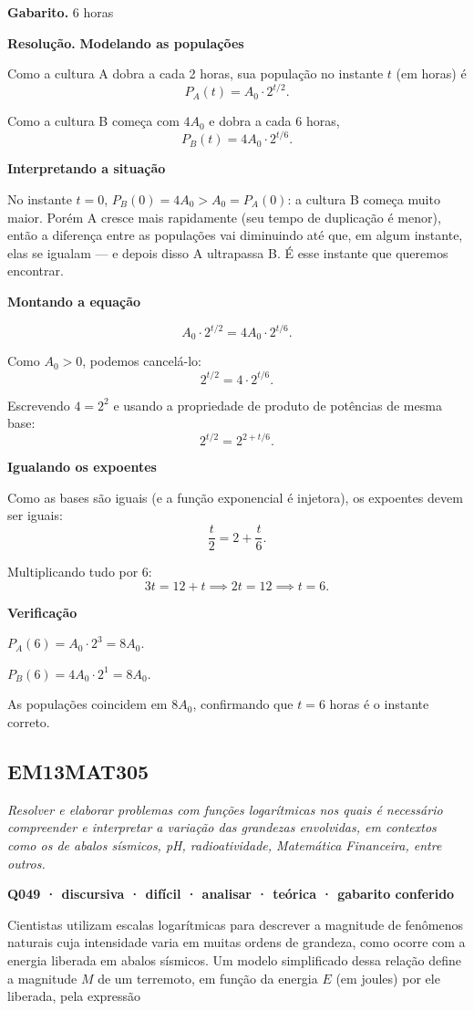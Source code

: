 \documentclass[11pt,a4paper]{article}
\begin{document}
\textbf{Gabarito.} 6 horas

\textbf{Resolução.} \textbf{Modelando as populações}

Como a cultura A dobra a cada 2 horas, sua população no instante $t$ (em horas) é
$$P_A(t) = A_0 \cdot 2^{t/2}.$$

Como a cultura B começa com $4A_0$ e dobra a cada 6 horas,
$$P_B(t) = 4A_0 \cdot 2^{t/6}.$$

\textbf{Interpretando a situação}

No instante $t=0$, $P_B(0)=4A_0 > A_0 = P_A(0)$: a cultura B começa muito maior. Porém A cresce mais rapidamente (seu tempo de duplicação é menor), então a diferença entre as populações vai diminuindo até que, em algum instante, elas se igualam — e depois disso A ultrapassa B. É esse instante que queremos encontrar.

\textbf{Montando a equação}

$$A_0 \cdot 2^{t/2} = 4A_0 \cdot 2^{t/6}.$$

Como $A_0 > 0$, podemos cancelá-lo:
$$2^{t/2} = 4 \cdot 2^{t/6}.$$

Escrevendo $4 = 2^2$ e usando a propriedade de produto de potências de mesma base:
$$2^{t/2} = 2^{2 + t/6}.$$

\textbf{Igualando os expoentes}

Como as bases são iguais (e a função exponencial é injetora), os expoentes devem ser iguais:
$$\frac{t}{2} = 2 + \frac{t}{6}.$$

Multiplicando tudo por 6:
$$3t = 12 + t \implies 2t = 12 \implies t = 6.$$

\textbf{Verificação}

$P_A(6) = A_0 \cdot 2^{3} = 8A_0$.

$P_B(6) = 4A_0 \cdot 2^{1} = 8A_0$.

As populações coincidem em $8A_0$, confirmando que $t = 6$ horas é o instante correto.
\subsection*{EM13MAT305}
{\small\itshape Resolver e elaborar problemas com funções logarítmicas nos quais é necessário compreender e interpretar a variação das grandezas envolvidas, em contextos como os de abalos sísmicos, pH, radioatividade, Matemática Financeira, entre outros.}

\bigskip\noindent\textbf{Q049 · discursiva · difícil · analisar · teórica · gabarito conferido}\par\nopagebreak
Cientistas utilizam escalas logarítmicas para descrever a magnitude de fenômenos naturais cuja intensidade varia em muitas ordens de grandeza, como ocorre com a energia liberada em abalos sísmicos. Um modelo simplificado dessa relação define a magnitude $M$ de um terremoto, em função da energia $E$ (em joules) por ele liberada, pela expressão
\end{document}
